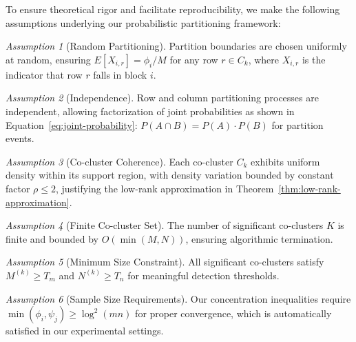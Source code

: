 \documentclass[journal]{IEEEtran}
\theoremstyle{definition}
\theoremstyle{remark} %
\newtheorem{assumption}{Assumption}
\begin{document}
{\color{blue}


    To ensure theoretical rigor and facilitate reproducibility, we make the following assumptions underlying our probabilistic partitioning framework:

    \begin{assumption}[Random Partitioning]
        \label{assumption:random-partitioning}
        Partition boundaries are chosen uniformly at random, ensuring $E[X_{i,r}] = \phi_i/M$ for any row $r \in C_k$, where $X_{i,r}$ is the indicator that row $r$ falls in block $i$.
    \end{assumption}

    \begin{assumption}[Independence]
        \label{assumption:independence}
        Row and column partitioning processes are independent, allowing factorization of joint probabilities as shown in Equation~\eqref{eq:joint-probability}: $P(A \cap B) = P(A) \cdot P(B)$ for partition events.
    \end{assumption}

    \begin{assumption}[Co-cluster Coherence]
        \label{assumption:co-cluster-coherence}
        Each co-cluster $C_k$ exhibits uniform density within its support region, with density variation bounded by constant factor $\rho \leq 2$, justifying the low-rank approximation in Theorem~\ref{thm:low-rank-approximation}.
    \end{assumption}

    \begin{assumption}[Finite Co-cluster Set]
        \label{assumption:finite-co-cluster-set}
        The number of significant co-clusters $K$ is finite and bounded by $O(\min(M,N))$, ensuring algorithmic termination.
    \end{assumption}

    \begin{assumption}[Minimum Size Constraint]
        \label{assumption:minimum-size-constraint}
        All significant co-clusters satisfy $M^{(k)} \geq T_m$ and $N^{(k)} \geq T_n$ for meaningful detection thresholds.
    \end{assumption}

    \begin{assumption}[Sample Size Requirements]
        \label{assumption:sample-size-requirements}
        Our concentration inequalities require $\min(\phi_i, \psi_j) \geq \log^2(mn)$ for proper convergence, which is automatically satisfied in our experimental settings.
    \end{assumption}
}
\end{document}
